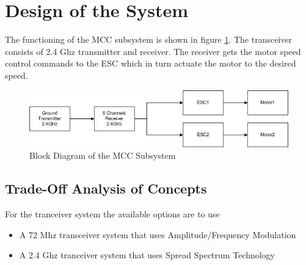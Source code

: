 \section{Design of the System}

The functioning of the MCC subsystem is shown in figure \ref{fig:design_block}. The transceiver consists of 2.4 Ghz transmitter and receiver. The receiver gets the motor speed control commands to the ESC which in turn actuate the motor to the desired speed.

\begin{figure}[bht]
\centering
\includegraphics[scale=0.8]{figures/blockdiagram.jpg}
\caption{Block Diagram of the MCC Subsystem}
\label{fig:design_block}
\end{figure}





\subsection{Trade-Off Analysis of Concepts}

For the tranceiver system the available options are to use
\begin{itemize}
\item A 72 Mhz transceiver system that uses Amplitude/Frequency Modulation
\item A 2.4 Ghz tranceiver system that uses Spread Spectrum Technology
\end{itemize}


